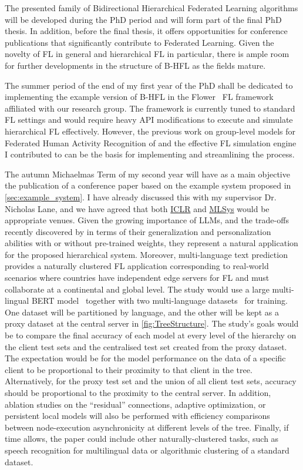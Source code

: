 The presented family of Bidirectional Hierarchical Federated Learning algorithms will be developed during the PhD period and will form part of the final PhD thesis. In addition, before the final thesis, it offers opportunities for conference publications that significantly contribute to Federated Learning. Given the novelty of FL in general and hierarchical FL in particular, there is ample room for further developments in the structure of B-HFL as the fields mature.

The summer period of the end of my first year of the PhD shall be dedicated to implementing the example version of B-HFL in the Flower~\citep{Flower} FL framework affiliated with our research group. The framework is currently tuned to standard FL settings and would require heavy API modifications to execute and simulate hierarchical FL effectively. However, the previous work on group-level models for Federated Human Activity Recognition of \citet{OperaWorkshop} and the effective FL simulation engine I contributed to can be the basis for implementing and streamlining the process.

The autumn Michaelmas Term of my second year will have as a main objective the publication of a conference paper based on the example system proposed in \cref{sec:example_system}. I have already discussed this with my supervisor Dr. Nicholas Lane, and we have agreed that both \href{https://iclr.cc/}{ICLR} and \href{https://mlsys.org/}{MLSys} would be appropriate venues. Given the growing importance of LLMs, and the trade-offs recently discovered by \citet{PersonalisationGeneralisationTradeoff} in terms of their generalization and personalization abilities with or without pre-trained weights, they represent a natural application for the proposed hierarchical system. Moreover, multi-language text prediction provides a naturally clustered FL application corresponding to real-world scenarios where countries have independent edge servers for FL and must collaborate at a continental and global level. The study would use a large multi-lingual BERT model~\citep{RoBERTA} together with two multi-language datasets~\citep[e.g., ][]{XGLUE,mC4} for training. One dataset will be partitioned by language, and the other will be kept as a proxy dataset at the central server in \cref{fig:TreeStructure}. The study's goals would be to compare the final accuracy of each model at every level of the hierarchy on the client test sets and the centralised test set created from the proxy dataset. The expectation would be for the model performance on the data of a specific client to be proportional to their proximity to that client in the tree. Alternatively, for the proxy test set and the union of all client test sets, accuracy should be proportional to the proximity to the central server. In addition, ablation studies on the ``residual'' connections, adaptive optimization, or persistent local models will also be performed with efficiency comparisons between node-execution asynchronicity at different levels of the tree.   Finally, if time allows, the paper could include other naturally-clustered tasks, such as speech recognition for multilingual data or algorithmic clustering of a standard dataset.

